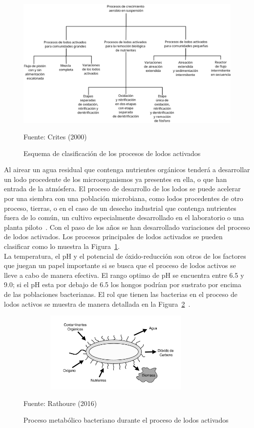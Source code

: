	\begin{figure}[!h]
		\centering
		\includegraphics[scale=0.2]{Clasificacion_procesos_aer.png}
		\caption{Esquema de clasificación de los procesos de lodos activados}
		\small{Fuente: Crites (2000)}
		\label{fig:procesosaer}
	\end{figure}
Al airear un agua residual que contenga nutrientes orgánicos tenderá a desarrollar un lodo procedente de los microorganismos ya presentes en ella, o que han entrada de la atmósfera. El proceso de desarrollo de los lodos se puede acelerar por una siembra con una población microbiana, como lodos procedentes de otro proceso, tierras, o en el caso de un desecho industrial que contenga nutrientes fuera de lo común, un cultivo especialmente desarrollado en el laboratorio o una planta piloto~\emph{\citep{winkler96}}.
Con el paso de los años se han desarrollado variaciones del proceso de lodos activados. Los procesos principales de lodos activados se pueden clasificar como lo muestra la Figura~\ref{fig:procesosaer}.\\
La temperatura, el pH y el potencial de óxido-reducción son otros de los factores que juegan un papel importante si se busca que el proceso de lodos activos se lleve a cabo de manera efectiva. El rango optimo de pH se encuentra entre 6.5 y 9.0; si el pH esta por debajo de 6.5 los hongos podrían por sustrato por encima de las poblaciones bacterianas. El rol que tienen las bacterias en el proceso de lodos activos se muestra de manera detallada en la Figura~\ref{fig:rolbacteria}~\emph{\citep{ashok16, winkler96}}.\\
	\begin{figure}[h]
		\centering
		\includegraphics[height=4cm,width=10cm]{Bacteria_rol.png}
		\caption{Proceso metabólico bacteriano durante el proceso de lodos activados}
		\small{Fuente: Rathoure (2016)}
		\label{fig:rolbacteria}
	\end{figure}
